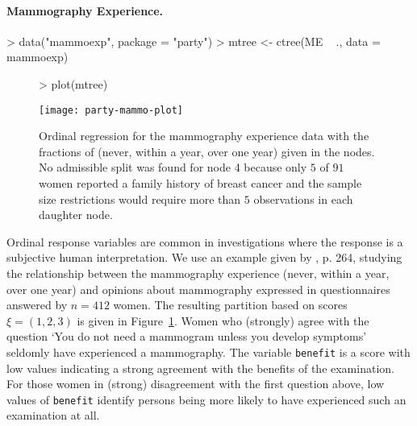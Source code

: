 \documentclass[letter]{article}
\begin{document}
\paragraph{Mammography Experience.}

\begin{Schunk}
\begin{Sinput}
> data("mammoexp", package = "party")
> mtree <- ctree(ME ~ ., data = mammoexp)
\end{Sinput}
\end{Schunk}

\begin{figure}[t]
\begin{center}
\begin{Schunk}
\begin{Sinput}
> plot(mtree)
\end{Sinput}
\end{Schunk}
\texttt{[image: party-mammo-plot]}
\caption{Ordinal regression for the mammography experience data with the
fractions of (never, within a year, over one year) given in the nodes.
No admissible split was found for node 4 because only $5$ of $91$ women reported 
a family history of breast cancer and the sample size restrictions would 
require more than $5$ observations in each daughter node. \label{mammoexp}}
\end{center}
\end{figure}


Ordinal response variables are common in investigations where the response
is a subjective human interpretation. 
We use an example given by \cite{HosmerLemeshow2000}, p. 264, 
studying the relationship between the mammography experience (never,
within a year, over one year) and opinions about mammography expressed in
questionnaires answered by $n = 412$ women. The resulting partition based on
scores $\xi = (1,2,3)$ is given in Figure~\ref{mammoexp}. 
Women who (strongly) agree with the question `You do not need a mammogram unless
you develop symptoms' seldomly have experienced a mammography. The variable
\texttt{benefit} is a score with low values indicating a strong agreement with the
benefits of the examination. For those women in (strong) disagreement with the first
question above, low values of \texttt{benefit} identify persons being more likely to have 
experienced such an examination at all. 




\end{document}
